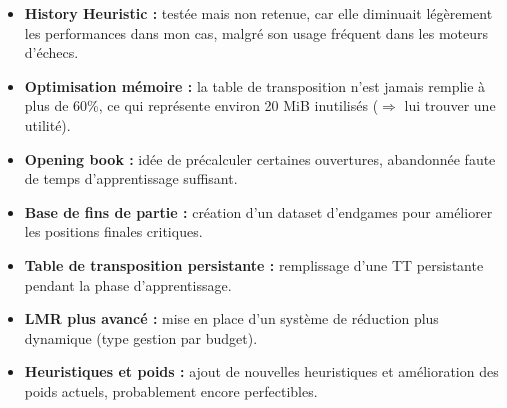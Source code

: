 \documentclass[11pt,a4paper]{article}
\begin{document}
\begin{itemize}
    \item \textbf{History Heuristic :} testée mais non retenue, car elle diminuait légèrement les performances dans mon cas, malgré son usage fréquent dans les moteurs d’échecs.
    
    \item \textbf{Optimisation mémoire :} la table de transposition n’est jamais remplie à plus de 60\%, ce qui représente environ 20 MiB inutilisés ($\Rightarrow$ lui trouver une utilité).
    
    \item \textbf{Opening book :} idée de précalculer certaines ouvertures, abandonnée faute de temps d’apprentissage suffisant.
    
    \item \textbf{Base de fins de partie :} création d’un dataset d’endgames pour améliorer les positions finales critiques.
    
    \item \textbf{Table de transposition persistante :} remplissage d'une TT persistante pendant la phase d’apprentissage.
    
    \item \textbf{LMR plus avancé :} mise en place d’un système de réduction plus dynamique (type gestion par budget).
    
    \item \textbf{Heuristiques et poids :} ajout de nouvelles heuristiques et amélioration des poids actuels, probablement encore perfectibles.
\end{itemize}
\end{document}
